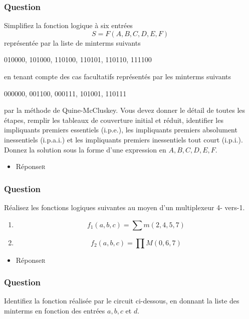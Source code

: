 \documentclass[11pt]{article}
\begin{document}
\subsubsection*{Question}
\label{sec:org60dfac7}
Simplifiez la fonction logique à six entrées
  $$
    S = F(A,B,C,D,E,F)
    $$
  représentée par la liste de minterms suivants

010000, 101000, 110100, 110101, 110110, 111100

en tenant compte des cas facultatifs représentés par les minterms
suivants

000000, 001100, 000111, 101001, 110111

par la méthode de Quine-McCluskey. Vous devez donner le détail de
toutes les étapes, remplir les tableaux de couverture initial et
réduit, identifier les impliquants premiers essentiels (i.p.e.), les
impliquants premiers absolument inessentiels (i.p.a.i.) et les
impliquants premiers inessentiels tout court (i.p.i.). Donnez la
solution sous la forme d'une expression en \(A,B,C,D,E,F\).

\begin{itemize}
\item Réponse\hfill{}\textsc{r}
\label{sec:org1821411}
\end{itemize}

\subsubsection*{Question}
\label{sec:org0fb074a}
Réalisez les fonctions logiques suivantes au moyen d'un multiplexeur
  4- vers-1.

\begin{enumerate}
\item $$f_1(a,b,c) = \sum m(2, 4, 5, 7)$$

\item $$f_2(a,b,c) = \prod M(0, 6, 7)$$
\end{enumerate}

\begin{itemize}
\item Réponse\hfill{}\textsc{r}
\label{sec:org8286d80}
\end{itemize}

\subsubsection*{Question}
\label{sec:org8994d0f}
Identifiez la fonction réalisée par le circuit ci-dessous, en donnant
  la liste des minterms en fonction des entrées \(a, b, c\) et \(d\).
\begin{center}

\end{center}
\end{document}
